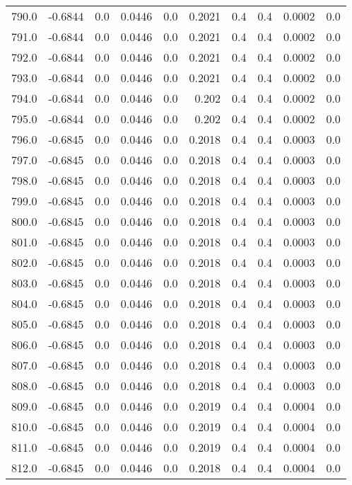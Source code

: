 \begin{longtable}{lrrrrrrrrr}
790.0 & -0.6844 & 0.0 & 0.0446 & 0.0 & 0.2021 & 0.4 & 0.4 & 0.0002 & 0.0 \\
791.0 & -0.6844 & 0.0 & 0.0446 & 0.0 & 0.2021 & 0.4 & 0.4 & 0.0002 & 0.0 \\
792.0 & -0.6844 & 0.0 & 0.0446 & 0.0 & 0.2021 & 0.4 & 0.4 & 0.0002 & 0.0 \\
793.0 & -0.6844 & 0.0 & 0.0446 & 0.0 & 0.2021 & 0.4 & 0.4 & 0.0002 & 0.0 \\
794.0 & -0.6844 & 0.0 & 0.0446 & 0.0 & 0.202 & 0.4 & 0.4 & 0.0002 & 0.0 \\
795.0 & -0.6844 & 0.0 & 0.0446 & 0.0 & 0.202 & 0.4 & 0.4 & 0.0002 & 0.0 \\
796.0 & -0.6845 & 0.0 & 0.0446 & 0.0 & 0.2018 & 0.4 & 0.4 & 0.0003 & 0.0 \\
797.0 & -0.6845 & 0.0 & 0.0446 & 0.0 & 0.2018 & 0.4 & 0.4 & 0.0003 & 0.0 \\
798.0 & -0.6845 & 0.0 & 0.0446 & 0.0 & 0.2018 & 0.4 & 0.4 & 0.0003 & 0.0 \\
799.0 & -0.6845 & 0.0 & 0.0446 & 0.0 & 0.2018 & 0.4 & 0.4 & 0.0003 & 0.0 \\
800.0 & -0.6845 & 0.0 & 0.0446 & 0.0 & 0.2018 & 0.4 & 0.4 & 0.0003 & 0.0 \\
801.0 & -0.6845 & 0.0 & 0.0446 & 0.0 & 0.2018 & 0.4 & 0.4 & 0.0003 & 0.0 \\
802.0 & -0.6845 & 0.0 & 0.0446 & 0.0 & 0.2018 & 0.4 & 0.4 & 0.0003 & 0.0 \\
803.0 & -0.6845 & 0.0 & 0.0446 & 0.0 & 0.2018 & 0.4 & 0.4 & 0.0003 & 0.0 \\
804.0 & -0.6845 & 0.0 & 0.0446 & 0.0 & 0.2018 & 0.4 & 0.4 & 0.0003 & 0.0 \\
805.0 & -0.6845 & 0.0 & 0.0446 & 0.0 & 0.2018 & 0.4 & 0.4 & 0.0003 & 0.0 \\
806.0 & -0.6845 & 0.0 & 0.0446 & 0.0 & 0.2018 & 0.4 & 0.4 & 0.0003 & 0.0 \\
807.0 & -0.6845 & 0.0 & 0.0446 & 0.0 & 0.2018 & 0.4 & 0.4 & 0.0003 & 0.0 \\
808.0 & -0.6845 & 0.0 & 0.0446 & 0.0 & 0.2018 & 0.4 & 0.4 & 0.0003 & 0.0 \\
809.0 & -0.6845 & 0.0 & 0.0446 & 0.0 & 0.2019 & 0.4 & 0.4 & 0.0004 & 0.0 \\
810.0 & -0.6845 & 0.0 & 0.0446 & 0.0 & 0.2019 & 0.4 & 0.4 & 0.0004 & 0.0 \\
811.0 & -0.6845 & 0.0 & 0.0446 & 0.0 & 0.2019 & 0.4 & 0.4 & 0.0004 & 0.0 \\
812.0 & -0.6845 & 0.0 & 0.0446 & 0.0 & 0.2018 & 0.4 & 0.4 & 0.0004 & 0.0 \\

\end{longtable}
